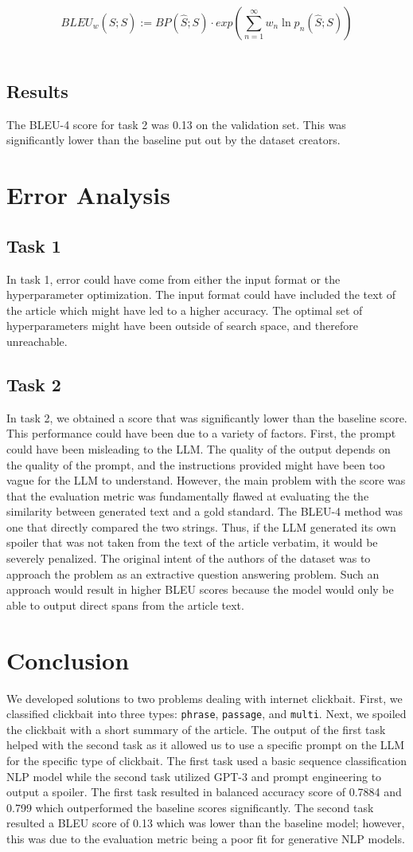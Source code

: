 \documentclass[12pt]{article}
\begin{document}
\small{\[BLEU _w(\hat{S}; S) := BP(\hat{S}; S) \cdot exp(\sum_{n =1}^\infty w_n \ln p_n (\hat{S}; S))\]} \normalsize
\
\subsection{Results}
The BLEU-4 score for task 2 was 0.13 on the validation set. This was significantly lower than the baseline put out by the dataset creators.
\section{Error Analysis}
\subsection{Task 1}
 In task 1, error could have come from either the input format or the hyperparameter optimization. The input format could have included the text of the article which might have led to a higher accuracy. The optimal set of hyperparameters might have been outside of search space, and therefore unreachable.
\subsection{Task 2}
In task 2, we obtained a score that was significantly lower than the baseline score. This performance could have been due to a variety of factors. First, the prompt could have been misleading to the LLM. The quality of the output depends on the quality of the prompt, and the instructions provided might have been too vague for the LLM to understand. However, the main problem with the score was that the evaluation metric was fundamentally flawed at evaluating the the similarity between generated text and a gold standard. The BLEU-4 method was one that directly compared the two strings. Thus, if the LLM generated its own spoiler that was not taken from the text of the article verbatim, it would be severely penalized. The original intent of the authors of the dataset was to approach the problem as an extractive question answering problem. Such an approach would result in higher BLEU scores because the model would only be able to output direct spans from the article text.
\section{Conclusion}
We developed solutions to two problems dealing with internet clickbait. First, we classified clickbait into three types: \verb|phrase|, \verb|passage|, and \verb|multi|. Next, we spoiled the clickbait with a short summary of the article. The output of the first task helped with the second task as it allowed us to use a specific prompt on the LLM for the specific type of clickbait. The first task used a basic sequence classification NLP model while the second task utilized GPT-3 and prompt engineering to output a spoiler. The first task resulted in balanced accuracy score of 0.7884 and 0.799 which outperformed the baseline scores significantly.  The second task resulted a BLEU score of 0.13 which was lower than the baseline model; however, this was due to the evaluation metric being a poor fit for generative NLP models. 
\end{document}
